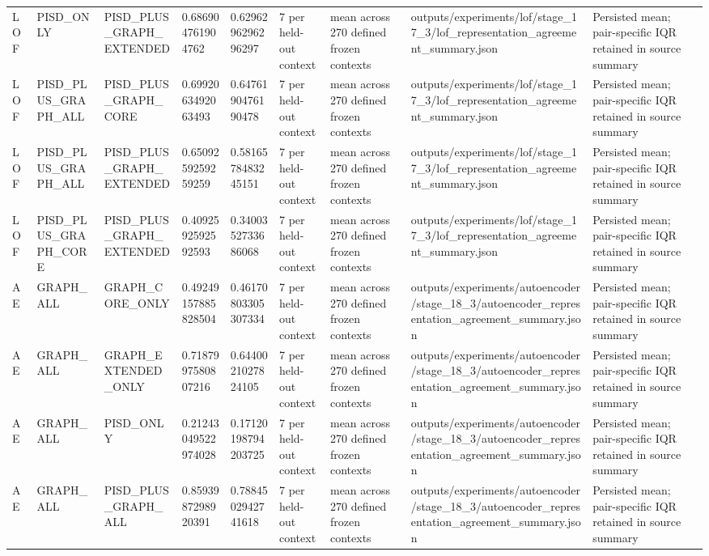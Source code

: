 \begin{longtable}{lllllllll}
LOF & PISD\_ONLY & PISD\_PLUS\_GRAPH\_EXTENDED & 0.686904761904762 & 0.6296296296296297 & 7 per held-out context & mean across 270 defined frozen contexts & outputs/experiments/lof/stage\_17\_3/lof\_representation\_agreement\_summary.json & Persisted mean; pair-specific IQR retained in source summary \\
LOF & PISD\_PLUS\_GRAPH\_ALL & PISD\_PLUS\_GRAPH\_CORE & 0.6992063492063493 & 0.6476190476190478 & 7 per held-out context & mean across 270 defined frozen contexts & outputs/experiments/lof/stage\_17\_3/lof\_representation\_agreement\_summary.json & Persisted mean; pair-specific IQR retained in source summary \\
LOF & PISD\_PLUS\_GRAPH\_ALL & PISD\_PLUS\_GRAPH\_EXTENDED & 0.6509259259259259 & 0.5816578483245151 & 7 per held-out context & mean across 270 defined frozen contexts & outputs/experiments/lof/stage\_17\_3/lof\_representation\_agreement\_summary.json & Persisted mean; pair-specific IQR retained in source summary \\
LOF & PISD\_PLUS\_GRAPH\_CORE & PISD\_PLUS\_GRAPH\_EXTENDED & 0.4092592592592593 & 0.3400352733686068 & 7 per held-out context & mean across 270 defined frozen contexts & outputs/experiments/lof/stage\_17\_3/lof\_representation\_agreement\_summary.json & Persisted mean; pair-specific IQR retained in source summary \\
AE & GRAPH\_ALL & GRAPH\_CORE\_ONLY & 0.49249157885828504 & 0.46170803305307334 & 7 per held-out context & mean across 270 defined frozen contexts & outputs/experiments/autoencoder/stage\_18\_3/autoencoder\_representation\_agreement\_summary.json & Persisted mean; pair-specific IQR retained in source summary \\
AE & GRAPH\_ALL & GRAPH\_EXTENDED\_ONLY & 0.7187997580807216 & 0.6440021027824105 & 7 per held-out context & mean across 270 defined frozen contexts & outputs/experiments/autoencoder/stage\_18\_3/autoencoder\_representation\_agreement\_summary.json & Persisted mean; pair-specific IQR retained in source summary \\
AE & GRAPH\_ALL & PISD\_ONLY & 0.21243049522974028 & 0.17120198794203725 & 7 per held-out context & mean across 270 defined frozen contexts & outputs/experiments/autoencoder/stage\_18\_3/autoencoder\_representation\_agreement\_summary.json & Persisted mean; pair-specific IQR retained in source summary \\
AE & GRAPH\_ALL & PISD\_PLUS\_GRAPH\_ALL & 0.8593987298920391 & 0.7884502942741618 & 7 per held-out context & mean across 270 defined frozen contexts & outputs/experiments/autoencoder/stage\_18\_3/autoencoder\_representation\_agreement\_summary.json & Persisted mean; pair-specific IQR retained in source summary \\

\end{longtable}
